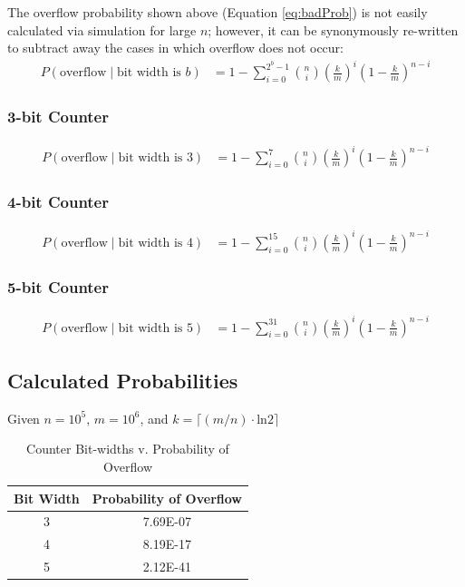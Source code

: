 \documentclass[conference]{styles/acmsiggraph}
\newcommand{\?}{\stackrel{?}{=}}
\begin{document}
The overflow probability shown above (Equation \ref{eq:badProb}) is not easily calculated via simulation for large $n$; however, it can be synonymously re-written to subtract away the cases in which overflow does not occur:
\begin{align} \label{eq:betterProb}
    P(\text{overflow} \mid \text{bit width is } b) &= 1 - \sum_{i = 0}^{2^b - 1} {n \choose i} \left( \frac{k}{m}\right )^i \left( 1 - \frac{k}{m} \right) ^{n-i}
\end{align}


\subsubsection{3-bit Counter}
\begin{align} \label{eq:betterProb}
    P(\text{overflow} \mid \text{bit width is } 3) &= 1 - \sum_{i = 0}^{7} {n \choose i} \left( \frac{k}{m}\right )^i \left( 1 - \frac{k}{m} \right) ^{n-i}
\end{align}


\subsubsection{4-bit Counter}
\begin{align} \label{eq:betterProb}
    P(\text{overflow} \mid \text{bit width is } 4) &= 1 - \sum_{i = 0}^{15} {n \choose i} \left( \frac{k}{m}\right )^i \left( 1 - \frac{k}{m} \right) ^{n-i}
\end{align}


\subsubsection{5-bit Counter}
\begin{align} \label{eq:betterProb}
    P(\text{overflow} \mid \text{bit width is } 5) &= 1 - \sum_{i = 0}^{31} {n \choose i} \left( \frac{k}{m}\right )^i \left( 1 - \frac{k}{m} \right) ^{n-i}
\end{align}

\subsection{Calculated Probabilities}
Given $n = 10^5$, $m = 10^6$, and $k = \lceil (m/n) \cdot \text{ln}2 \rceil$

\begin{table}[htbp]
  \centering
    \begin{tabular}{c|c}
    \multicolumn{1}{c}{Bit Width} & Probability of Overflow \\
    \midrule
    3     & 7.69E-07 \\
    4     & 8.19E-17 \\
    5     & 2.12E-41 \\
    \end{tabular}%
  \label{tab:bitWidth}%
  \caption{Counter Bit-widths v. Probability of Overflow}
\end{table}%
\end{document}
